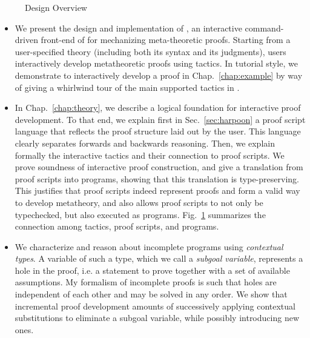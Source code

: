 \begin{figure}[t]
  \centering
  
  \caption{\Harpoon{} Design Overview}
  \label{fig:harpoon}
\end{figure}

\begin{itemize}
\item
  We present the design and implementation of \Harpoon, an
  interactive command-driven front-end of \Beluga{} for mechanizing
  meta-theoretic proofs.
  Starting from a user-specified theory (including both its syntax and its
  judgments), users interactively develop metatheoretic proofs using tactics.
  In tutorial style, we demonstrate \Harpoon{} to interactively
  develop a proof in Chap.~\ref{chap:example} by way of giving a whirlwind tour of
  the main supported tactics in \Harpoon.

\item
  In Chap.~\ref{chap:theory}, we describe a logical foundation for interactive
  proof development. To that end, we explain first in Sec.~\ref{sec:harpoon} a
  proof script language that reflects the proof structure laid out by the
  user. This language clearly separates forwards and backwards reasoning.
  Then, we explain formally the interactive tactics and their connection to proof
  scripts. We prove soundness of interactive proof construction, and give a
  translation from proof scripts into \Beluga{} programs, showing that this
  translation is type-preserving.
  This justifies that proof scripts indeed represent proofs and form a valid way
  to develop metatheory, and also allows proof scripts to not only be
  typechecked, but also executed as programs.
  Fig.~\ref{fig:harpoon} summarizes the connection among tactics, proof
  scripts, and \Beluga{} programs.

\item
  We characterize and reason about incomplete programs using
  \emph{contextual types}.
  A variable of such a type, which we call a \emph{subgoal variable}, represents a
  hole in the proof, i.e. a statement to prove together with a set of available
  assumptions.
  My formalism of incomplete proofs is such that holes are independent of each
  other and may be solved in any order.
  We show that incremental proof development amounts of successively applying
  contextual substitutions to eliminate a subgoal variable, while possibly
  introducing new ones.


\end{itemize}
